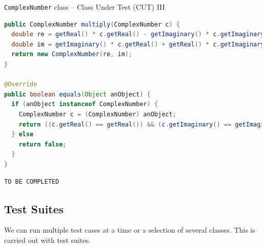 \documentclass[11pt, xcolor=svgnames]{beamer}
\begin{document}

\begin{frame}[fragile]{\texttt{ComplexNumber} class -- Class Under Test (CUT) III}

\begin{lstlisting}[language=Java,basicstyle=\scriptsize]
public ComplexNumber multiply(ComplexNumber c) {
  double re = getReal() * c.getReal() - getImaginary() * c.getImaginary();
  double im = getImaginary() * c.getReal() + getReal() * c.getImaginary();
  return new ComplexNumber(re, im);
}

@Override
public boolean equals(Object anObject) {
  if (anObject instanceof ComplexNumber) {
    ComplexNumber c = (ComplexNumber) anObject;
    return ((c.getReal() == getReal()) && (c.getImaginary() == getImaginary()));
  } else
    return false;
  }
}
\end{lstlisting}

\end{frame}


\begin{frame}[fragile]
\begin{lstlisting}[language=JAVA,basicstyle=\scriptsize]
TO BE COMPLETED


\end{lstlisting}
\end{frame}




\subsection{Test Suites}


\begin{frame}

We can run multiple test cases at a time or a selection of several classes. This is carried out with test suites.

\end{frame}

\end{document}
